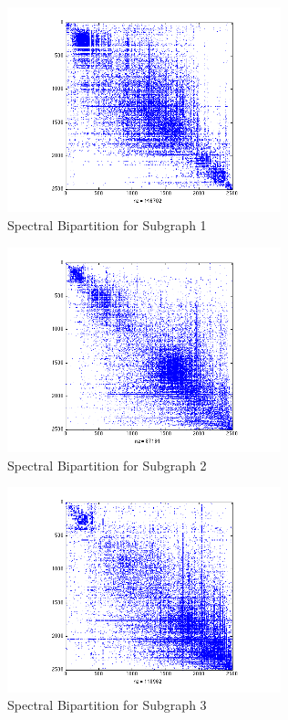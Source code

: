 \documentclass[11pt]{article}
\begin{document}
		 \begin{figure}
		 		\begin{center}
		  		\includegraphics[width=300px]{../graphs/spectral_partition_a1.png}
		  	\end{center}
		  	\caption{Spectral Bipartition for Subgraph 1}
		  	\label{fig:sb1}
		 \end{figure}
		 
		 \begin{figure}
		 		\begin{center}
		  		\includegraphics[width=300px]{../graphs/spectral_partition_a2.png}
		  	\end{center}
		  	\caption{Spectral Bipartition for Subgraph 2}
		  	\label{fig:sb2}
		 \end{figure}
		 
		 \begin{figure}
		 		\begin{center}
		  		\includegraphics[width=300px]{../graphs/spectral_partition_a3.png}
		  	\end{center}
		  	\caption{Spectral Bipartition for Subgraph 3}
		  	\label{fig:sb3}
		 \end{figure}
		 
\end{document}
